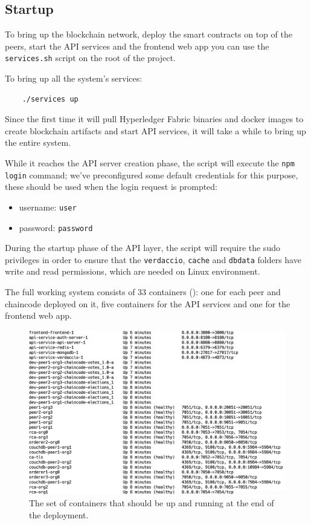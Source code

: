 \documentclass{scrartcl}
\begin{document}
\subsection{Startup}

To bring up the blockchain network, deploy the smart contracts on top of the peers, start the API services and the frontend web app you can use the \texttt{services.sh} script on the root of the project.

To bring up all the system's services:

\begin{verbatim}
    ./services up
\end{verbatim}

Since the first time it will pull Hyperledger Fabric binaries and docker images to create blockchain artifacts and start API services, it will take a while to bring up the entire system.

While it reaches the API server creation phase, the script will execute the \texttt{npm login} command; we've preconfigured some default credentials for this purpose, these should be used when the login request is prompted:
\begin{itemize}
    \item username: \texttt{user}
    \item password: \texttt{password}
\end{itemize} 

\begin{warn}
    During the startup phase of the API layer, the script will require the sudo privileges in order to ensure that the \texttt{verdaccio}, \texttt{cache} and \texttt{dbdata} folders have write and read permissions, which are needed on Linux environment.
\end{warn}

The full working system consists of 33 containers (): one for each peer and chaincode deployed on it, five containers for the API services and one for the frontend web app.

\begin{figure}[h!]
    \centering
    \includegraphics[width=\linewidth]{figures/containers.png}
    \caption{The set of containers that should be up and running at the end of the deployment.}
    \label{fig:containers} 
\end{figure}
\end{document}
